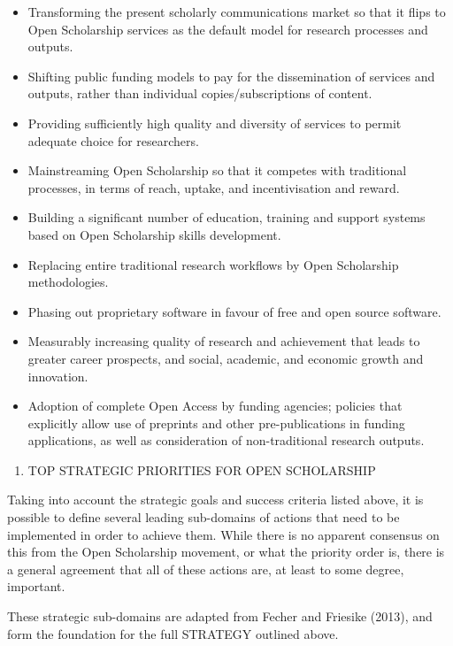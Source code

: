 \documentclass[]{article}
\providecommand{\tightlist}{%
  \setlength{\itemsep}{0pt}\setlength{\parskip}{0pt}}
\begin{document}
\begin{itemize}
\item
  Transforming the present scholarly communications market so that it
  flips to Open Scholarship services as the default model for research
  processes and outputs.
\item
  Shifting public funding models to pay for the dissemination of
  services and outputs, rather than individual copies/subscriptions of
  content.
\item
  Providing sufficiently high quality and diversity of services to
  permit adequate choice for researchers.
\item
  Mainstreaming Open Scholarship so that it competes with traditional
  processes, in terms of reach, uptake, and incentivisation and reward.
\item
  Building a significant number of education, training and support
  systems based on Open Scholarship skills development.
\item
  Replacing entire traditional research workflows by Open Scholarship
  methodologies.
\item
  Phasing out proprietary software in favour of free and open source
  software.
\item
  Measurably increasing quality of research and achievement that leads
  to greater career prospects, and social, academic, and economic growth
  and innovation.
\item
  Adoption of complete Open Access by funding agencies; policies that
  explicitly allow use of preprints and other pre-publications in
  funding applications, as well as consideration of non-traditional
  research outputs.
\end{itemize}

\begin{enumerate}
\def\labelenumi{\arabic{enumi}.}
\setcounter{enumi}{4}
\tightlist
\item
  TOP STRATEGIC PRIORITIES FOR OPEN SCHOLARSHIP
\end{enumerate}

Taking into account the strategic goals and success criteria listed
above, it is possible to define several leading sub-domains of actions
that need to be implemented in order to achieve them. While there is no
apparent consensus on this from the Open Scholarship movement, or what
the priority order is, there is a general agreement that all of these
actions are, at least to some degree, important.

These strategic sub-domains are adapted from Fecher and Friesike (2013),
and form the foundation for the full STRATEGY outlined above.
\end{document}

